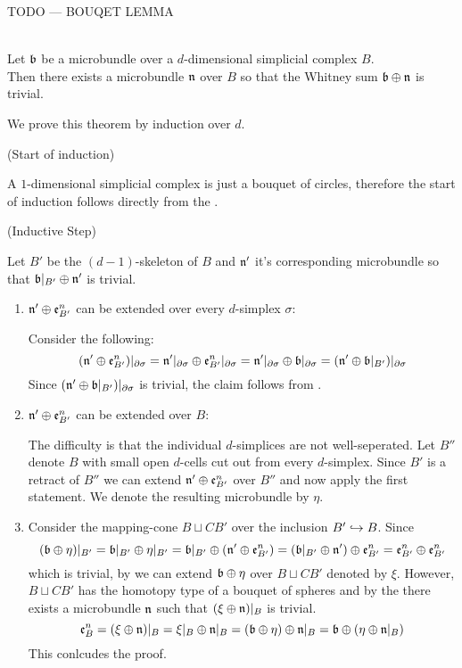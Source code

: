 TODO --- BOUQET LEMMA

\\ Let $\mathfrak{b}$ be a microbundle over a $d$-dimensional simplicial complex $B$.
\\ Then there exists a microbundle $\mathfrak{n}$ over $B$ so that the Whitney sum $\mathfrak{b} \oplus \mathfrak{n}$ is trivial.
\begin{myproof}
We prove this theorem by induction over $d$.

(Start of induction)

A $1$-dimensional simplicial complex is just a bouquet of circles, therefore
the start of induction follows directly from the .   

(Inductive Step)

Let $B'$ be the $(d - 1)$-skeleton of $B$ and $\mathfrak{n}'$ it's corresponding microbundle
so that $\mathfrak{b}\vert_{B'} \oplus \mathfrak{n}'$ is trivial.

\begin{enumerate}
    \item $\mathfrak{n}' \oplus \mathfrak{e}^n_{B'}$ can be extended over every $d$-simplex $\sigma$:

    Consider the following:
    \[
        (\mathfrak{n}' \oplus \mathfrak{e}^n_{B'})\vert_{\partial\sigma}
        = \mathfrak{n}'\vert_{\partial\sigma} \oplus \mathfrak{e}^n_{B'}\vert_{\partial\sigma}
        = \mathfrak{n}'\vert_{\partial\sigma} \oplus \mathfrak{b}\vert_{\partial\sigma}
        = (\mathfrak{n}' \oplus \mathfrak{b}\vert_{B'})\vert_{\partial\sigma}
    \]
    Since $(\mathfrak{n}' \oplus \mathfrak{b}\vert_{B'})\vert_{\partial\sigma}$ is trivial, the claim follows from .

    \item $\mathfrak{n}' \oplus \mathfrak{e}^n_{B'}$ can be extended over $B$:

    The difficulty is that the individual $d$-simplices are not well-seperated.
    Let $B''$ denote $B$ with small open $d$-cells cut out from every $d$-simplex.
    Since $B'$ is a retract of $B''$ we can extend $\mathfrak{n}' \oplus \mathfrak{e}^n_{B'}$ over $B''$ and now apply the first statement.
    We denote the resulting microbundle by $\eta$.

    \item
    Consider the mapping-cone $B \sqcup CB'$ over the inclusion $B' \hookrightarrow{} B$.
    Since
    \[
        (\mathfrak{b} \oplus \eta)\vert_{B'}
        = \mathfrak{b}\vert_{B'} \oplus \eta\vert_{B'}
        = \mathfrak{b}\vert_{B'} \oplus (\mathfrak{n}' \oplus \mathfrak{e}^n_{B'})
        = (\mathfrak{b}\vert_{B'} \oplus \mathfrak{n}') \oplus \mathfrak{e}^n_{B'}
        = \mathfrak{e}^n_{B'} \oplus \mathfrak{e}^n_{B'}
    \]
    which is trivial, by  we can extend $\mathfrak{b} \oplus \eta$ over $B \sqcup CB'$ denoted by $\xi$.
    However, $B \sqcup CB'$ has the homotopy type of a bouquet of spheres and by the  there exists a microbundle $\mathfrak{n}$ such that $(\xi \oplus \mathfrak{n})\vert_{B}$ is trivial.
    \[ 
        \mathfrak{e}^n_{B}
        = (\xi \oplus \mathfrak{n})\vert_{B}
        = \xi\vert_{B} \oplus \mathfrak{n}\vert_{B}
        = (\mathfrak{b} \oplus \eta) \oplus \mathfrak{n}\vert_{B}
        = \mathfrak{b} \oplus (\eta \oplus \mathfrak{n}\vert_{B})
    \]
    This conlcudes the proof.
\end{enumerate}

\end{myproof}